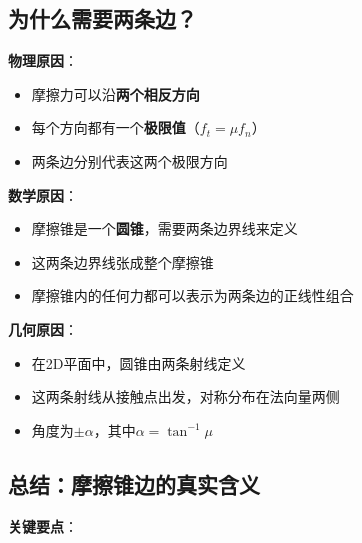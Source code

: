 \documentclass[12pt,a4paper]{article}
\begin{document}
\subsection{为什么需要两条边？}

\textbf{物理原因}：
\begin{itemize}
\item 摩擦力可以沿\textbf{两个相反方向}
\item 每个方向都有一个\textbf{极限值}（$f_t = \mu f_n$）
\item 两条边分别代表这两个极限方向
\end{itemize}

\textbf{数学原因}：
\begin{itemize}
\item 摩擦锥是一个\textbf{圆锥}，需要两条边界线来定义
\item 这两条边界线张成整个摩擦锥
\item 摩擦锥内的任何力都可以表示为两条边的正线性组合
\end{itemize}

\textbf{几何原因}：
\begin{itemize}
\item 在2D平面中，圆锥由两条射线定义
\item 这两条射线从接触点出发，对称分布在法向量两侧
\item 角度为$\pm \alpha$，其中$\alpha = \tan^{-1}\mu$
\end{itemize}

\subsection{总结：摩擦锥边的真实含义}

\textbf{关键要点}：
\end{document}

